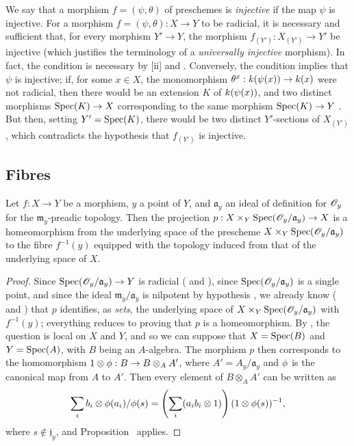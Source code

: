 \begin{remark}[3.5.11]
\label{I.3.5.11}
We say that a morphism $f=(\psi,\theta)$ of preschemes is \emph{injective} if the map $\psi$ is injective.
For a morphism $f=(\psi,\theta):X\to Y$ to be radicial, it is necessary and sufficient that, for every morphism $Y'\to Y$, the morphism $f_{(Y')}:X_{(Y')}\to Y'$ be injective (which justifies the terminology of a \emph{universally injective} morphism).
In fact, the condition is necessary by [ii] and .
Conversely, the condition implies that $\psi$ is injective; if, for some $x\in X$, the monomorphism $\theta^x:\kres(\psi(x))\to\kres(x)$ were not radicial, then there would be an extension $K$ of $k(\psi(x))$, and two distinct morphisms $\Spec(K)\to X$ corresponding to the same morphism $\Spec(K)\to Y$ .
But then, setting $Y'=\operatorname{Spec}(K)$, there would be two distinct $Y'$-sections of $X_{(Y')}$ , which contradicts the hypothesis that $f_{(Y')}$ is injective.
\end{remark}

\subsection{Fibres}
\label{subsection:I.3.6}

\begin{proposition}[3.6.1]
\label{I.3.6.1}
Let $f:X\to Y$ be a morphism, $y$ a point of $Y$, and $\mathfrak{a}_y$ an ideal of definition for $\mathscr{O}_y$ for the $\mathfrak{m}_y$-preadic topology.
Then the projection $p:X\times_Y\Spec(\sh{O}_y/\mathfrak{a}_y)\to X$ is a homeomorphism from the underlying space of the prescheme $X\times_Y\operatorname{Spec}(\mathscr{O}_y/\mathfrak{a}_y)$ to the fibre $f^{-1}(y)$ equipped with the topology induced from that of the underlying space of $X$.
\end{proposition}

\begin{proof}
Since $\Spec(\sh{O}_y/\mathfrak{a}_y)\to Y$ is radicial ( and ), since $\operatorname{Spec}(\mathscr{O}_y/\mathfrak{a}_y)$ is a single point, and since the ideal $\mathfrak{m}_y/\mathfrak{a}_y$ is nilpotent by hypothesis , we already know ( and ) that $p$ identifies, as \emph{sets}, the underlying space of $X\times_Y\operatorname{Spec}(\mathscr{O}_y/\mathfrak{a}_y)$ with $f^{-1}(y)$; everything reduces to proving that $p$ is a homeomorphism.
By , the question is local on $X$ and $Y$, and so we can suppose that $X=\operatorname{Spec}(B)$ and $Y=\operatorname{Spec}(A)$, with $B$ being an $A$-algebra.
The morphism $p$ then corresponds to the homomorphism $1\otimes\vphi:B\to B\otimes_A A'$, where $A'=A_y/\mathfrak{a}_y$ and $\phi$ is the canonical map from $A$ to $A'$.
Then every element of $B\otimes_A A'$ can be written as
\[
  \sum_i b_i\otimes\phi(a_i)/\phi(s)=\left(\sum_i(a_ib_i\otimes1)\right)(1\otimes\phi(s))^{-1},
\]
where $s\not\in\mathfrak{j}_y$, and Proposition~ applies.
\end{proof}

